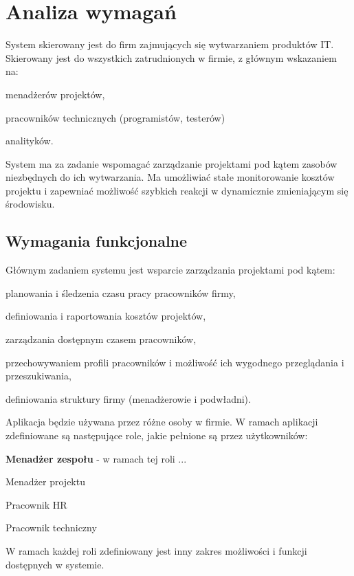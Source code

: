 \section{Analiza wymagań}
System skierowany jest do firm zajmujących się wytwarzaniem produktów IT. Skierowany jest do wszystkich zatrudnionych w firmie, z głównym wskazaniem na:
\begin{itemize*}
\item menadżerów projektów,
\item pracowników technicznych (programistów, testerów)
\item analityków.
\end{itemize*}

System ma za zadanie wspomagać zarządzanie projektami pod kątem zasobów niezbędnych do ich wytwarzania. Ma umożliwiać stałe monitorowanie kosztów projektu i zapewniać możliwość szybkich reakcji w dynamicznie zmieniającym się środowisku.
\subsection{Wymagania funkcjonalne}
Głównym zadaniem systemu jest wsparcie zarządzania projektami pod kątem:
\begin{itemize*}
\item planowania i śledzenia czasu pracy pracowników firmy,
\item definiowania i raportowania kosztów projektów,
\item zarządzania dostępnym czasem pracowników,
\item przechowywaniem profili pracowników i możliwość ich wygodnego przeglądania i przeszukiwania,
\item definiowania struktury firmy (menadżerowie i podwładni).
\end{itemize*}

Aplikacja będzie używana przez różne osoby w firmie. W ramach aplikacji zdefiniowane są następujące role, jakie pełnione są przez użytkowników:
\begin{itemize*}
\item \textbf{Menadżer zespołu} - w ramach tej roli ...
\item Menadżer projektu
\item Pracownik HR
\item Pracownik techniczny
\end{itemize*}
W ramach każdej roli zdefiniowany jest inny zakres możliwości i funkcji dostępnych w systemie.


